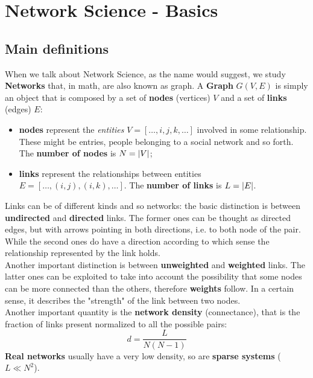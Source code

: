 \documentclass[../main/main.tex]{subfiles}
\begin{document}
\chapter{Network Science - Basics}

\section{Main definitions}

When we talk about Network Science, as the name would suggest, we study \textbf{Networks} that, in math, are also known as graph.
A \textbf{Graph} $G(V,E)$ is simply an object that is composed by a set of \textbf{nodes} (vertices) \( V \) and a set of \textbf{links} (edges) \( E \):
\begin{itemize}
\item \textbf{nodes} represent the \emph{entities} \( V=[\dots,i,j,k,\dots] \) involved in some relationship. These might be entries, people belonging to a social network and so forth. The \textbf{number of nodes} is \( N= \abs{V}  \);

\item \textbf{links} represent the relationships between entities \( E=[\dots,(i,j),(i,k),\dots] \). The \textbf{number of links} is \( L= \abs{E}  \).
\end{itemize}

Links can be of different kinds and so networks: the basic distinction is between \textbf{undirected} and \textbf{directed} links. The former ones can be thought as directed edges, but with arrows pointing in both directions, i.e. to both node of the pair. While the second ones do have a direction according to which sense the relationship represented by the link holds.\\
Another important distinction is between \textbf{unweighted} and \textbf{weighted} links. The latter ones can be exploited to take into account the possibility that some nodes can be more connected than the others, therefore \textbf{weights} follow. In a certain sense, it describes the "strength" of the link between two nodes.\\

Another important quantity is the \textbf{network density} (connectance), that is the fraction of links present normalized to all the possible pairs:
\begin{equation}
  d = \frac{L}{N(N-1)}
\end{equation}
\textbf{Real networks} usually have a very low density, so are \textbf{sparse systems} (\( L \ll N^2 \)).
\end{document}
